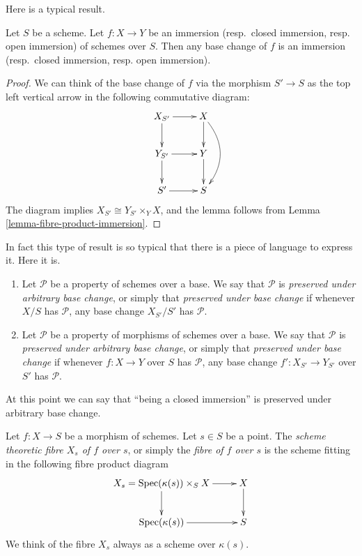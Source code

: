 \noindent
Here is a typical result.

\begin{lemma}
\label{lemma-base-change-immersion}
Let $S$ be a scheme. Let $f : X \to Y$ be an
immersion (resp.\ closed immersion, resp. open immersion)
of schemes over $S$. Then any base change of $f$ is an
immersion (resp.\ closed immersion, resp. open immersion).
\end{lemma}

\begin{proof}
We can think of the base change of $f$ via the morphism
$S' \to S$ as the top left vertical arrow in the following
commutative diagram:
$$
\xymatrix{
X_{S'} \ar[r] \ar[d] & X \ar[d] \ar@/^4ex/[dd] \\
Y_{S'} \ar[r] \ar[d] & Y \ar[d] \\
S' \ar[r] & S
}
$$
The diagram implies $X_{S'} \cong Y_{S'} \times_Y X$,
and the lemma follows from Lemma \ref{lemma-fibre-product-immersion}.
\end{proof}

\noindent
In fact this type of result is so typical that there is a
piece of language to express it. Here it is.

\begin{definition}
\label{definition-preserved-by-base-change}
\begin{enumerate}
\item Let $\mathcal{P}$ be a property of schemes over a base.
We say that $\mathcal{P}$ is {\it preserved under arbitrary base change},
or simply that {\it preserved under base change} if whenever $X/S$
has $\mathcal{P}$, any base change $X_{S'}/S'$ has $\mathcal{P}$.
\item Let $\mathcal{P}$ be a property of morphisms of schemes over a base.
We say that $\mathcal{P}$ is {\it preserved under arbitrary base change},
or simply that {\it preserved under base change} if whenever
$f : X \to Y$ over $S$ has $\mathcal{P}$, any base change
$f' : X_{S'} \to Y_{S'}$ over $S'$ has $\mathcal{P}$.
\end{enumerate}
\end{definition}

\noindent
At this point we can say that ``being a closed immersion'' is
preserved under arbitrary base change.

\begin{definition}
\label{definition-fibre}
Let $f : X \to S$ be a morphism of schemes.
Let $s \in S$ be a point.
The {\it scheme theoretic fibre $X_s$ of $f$ over $s$},
or simply the {\it fibre of $f$ over $s$}
is the scheme fitting in the following fibre product diagram
$$
\xymatrix{
X_s = \text{Spec}(\kappa(s)) \times_S X \ar[r] \ar[d] &
X \ar[d] \\
\text{Spec}(\kappa(s)) \ar[r] &
S
}
$$
We think of the fibre $X_s$ always as a scheme over $\kappa(s)$.
\end{definition}

